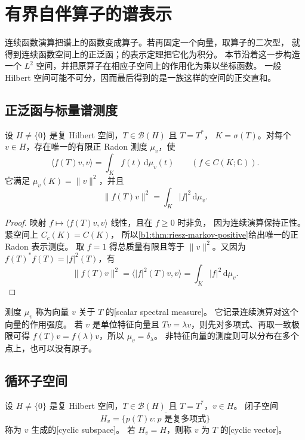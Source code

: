 \section{有界自伴算子的谱表示}
\label{b1:sec:2903}

连续函数演算把谱上的函数变成算子。若再固定一个向量，取算子的二次型，
就得到连续函数空间上的正泛函；的表示定理把它化为积分。
本节沿着这一步构造一个 \(L^2\) 空间，并把原算子在相应子空间上的作用化为乘以坐标函数。
一般 Hilbert 空间可能不可分，因而最后得到的是一族这样的空间的正交直和。

\subsection{正泛函与标量谱测度}
\label{b1:subsec:290301}

\begin{proposition}[向量所确定的标量测度]
\label{b1:prop:29-scalar-spectral-measure}
设 \(H\ne\{0\}\) 是复 Hilbert 空间，\(T\in\mathcal B(H)\) 且 \(T=T^*\)，
\(K=\sigma(T)\)。对每个 \(v\in H\)，存在唯一的有限正 Radon 测度 \(\mu_v\)，使
\[
 \langle f(T)v,v\rangle=\int_K f(t)\,\mathrm{d}\mu_v(t)
 \qquad(f\in C(K;\mathbb C)).
\]
它满足 \(\mu_v(K)=\|v\|^2\)，并且
\[
 \|f(T)v\|^2=\int_K|f|^2\,\mathrm{d}\mu_v.
\]
\end{proposition}
\begin{proof}
映射 \(f\mapsto\langle f(T)v,v\rangle\) 线性，且在 \(f\geq0\) 时非负，
因为连续演算保持正性。紧空间上 \(C_c(K)=C(K)\)，
所以\cref{b1:thm:riesz-markov-positive}给出唯一的正 Radon 表示测度。
取 \(f=1\) 得总质量有限且等于 \(\|v\|^2\)。又因为
\(f(T)^*f(T)=|f|^2(T)\)，有
\[
 \|f(T)v\|^2=\langle |f|^2(T)v,v\rangle
 =\int_K|f|^2\,\mathrm{d}\mu_v.
\]
\end{proof}

测度 \(\mu_v\) 称为向量 \(v\) 关于 \(T\) 的[scalar spectral measure]。
它记录连续演算对这个向量的作用强度。
若 \(v\) 是单位特征向量且 \(Tv=\lambda v\)，则先对多项式、再取一致极限可得
\(f(T)v=f(\lambda)v\)，所以 \(\mu_v=\delta_\lambda\)。
非特征向量的测度则可以分布在多个点上，也可以没有原子。

\subsection{循环子空间}
\label{b1:subsec:290302}

\begin{definition}[循环子空间]
\label{b1:def:29-cyclic-subspace}
设 \(H\ne\{0\}\) 是复 Hilbert 空间，\(T\in\mathcal B(H)\) 且 \(T=T^*\)，\(v\in H\)。
闭子空间
\[
 H_v=\overline{\{p(T)v:p\text{ 是复多项式}\}}
\]
称为 \(v\) 生成的[cyclic subspace]。
若 \(H_v=H\)，则称 \(v\) 为 \(T\) 的[cyclic vector]。
\end{definition}

